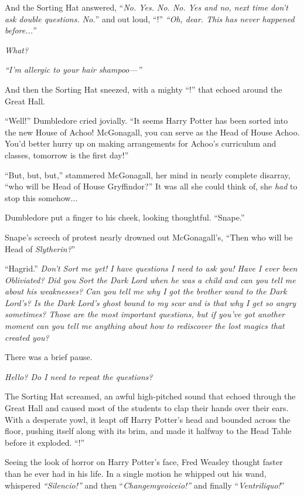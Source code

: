 And the Sorting Hat answered, “\emph{No. Yes. No. No. Yes and no, next time don’t ask double questions. No.}” and out loud, “!”
\sbreak
\emph{“Oh, dear. This has never happened before...”}

\emph{What?}

\emph{“I’m allergic to your hair shampoo—”}

And then the Sorting Hat sneezed, with a mighty “!” that echoed around the Great Hall.

“Well!” Dumbledore cried jovially. “It seems Harry Potter has been sorted into the new House of Achoo! McGonagall, you can serve as the Head of House Achoo. You’d better hurry up on making arrangements for Achoo’s curriculum and classes, tomorrow is the first day!”

“But, but, but,” stammered McGonagall, her mind in nearly complete disarray, “who will be Head of House Gryffindor?” It was all she could think of, she \emph{had} to stop this somehow...

Dumbledore put a finger to his cheek, looking thoughtful. “Snape.”

Snape’s screech of protest nearly drowned out McGonagall’s, “Then who will be Head of \emph{Slytherin?}”

“Hagrid.”
\sbreak
\emph{Don’t Sort me yet! I have questions I need to ask you! Have I ever been Obliviated? Did you Sort the Dark Lord when he was a child and can you tell me about his weaknesses? Can you tell me why I got the brother wand to the Dark Lord’s? Is the Dark Lord’s ghost bound to my scar and is that why I get so angry sometimes? Those are the most important questions, but if you’ve got another moment can you tell me anything about how to rediscover the lost magics that created you?}

There was a brief pause.

\emph{Hello? Do I need to repeat the questions?}

The Sorting Hat screamed, an awful high-pitched sound that echoed through the Great Hall and caused most of the students to clap their hands over their ears. With a desperate yowl, it leapt off Harry Potter’s head and bounded across the floor, pushing itself along with its brim, and made it halfway to the Head Table before it exploded.
\sbreak
“!”

\sloppypar Seeing the look of horror on Harry Potter’s face, Fred Weasley thought faster than he ever had in his life. In a single motion he whipped out his wand, whispered \emph{“Silencio!”} and then “\emph{Changemyvoiceio!”} and \mbox{finally} “\emph{Ventriliquo!}”

